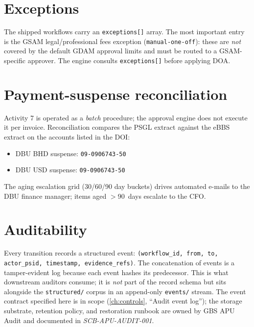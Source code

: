 \section{Exceptions}

The shipped workflows carry an \texttt{exceptions[]} array. The most
important entry is the GSAM legal/professional fees exception
(\texttt{manual-one-off}): these are \emph{not} covered by the default
GDAM approval limits and must be routed to a GSAM-specific approver. The
engine consults \texttt{exceptions[]} before applying DOA.

\section{Payment-suspense reconciliation}

Activity 7 is operated as a \emph{batch} procedure; the approval engine
does not execute it per invoice. Reconciliation compares the PSGL
extract against the eBBS extract on the accounts listed in the DOI:

\begin{itemize}
  \item DBU BHD suspense: \texttt{09-0906743-50}
  \item DBU USD suspense: \texttt{09-0906743-50}
\end{itemize}

The aging escalation grid (30/60/90 day buckets) drives automated
e-mails to the DBU finance manager; items aged $>$90~days escalate to
the CFO.

\section{Auditability}

Every transition records a structured event:
\texttt{(workflow\_id, from, to, actor\_psid, timestamp, evidence\_refs)}.
The concatenation of events is a tamper-evident log because each event
hashes its predecessor. This is what downstream auditors consume; it
is \emph{not} part of the record schema but sits alongside the
\texttt{structured/} corpus in an append-only \texttt{events/} stream.
The event contract specified here is in scope (\cref{ch:controls},
``Audit event log''); the storage substrate, retention policy, and
restoration runbook are owned by GBS APU Audit and documented in
\emph{SCB-APU-AUDIT-001}.
